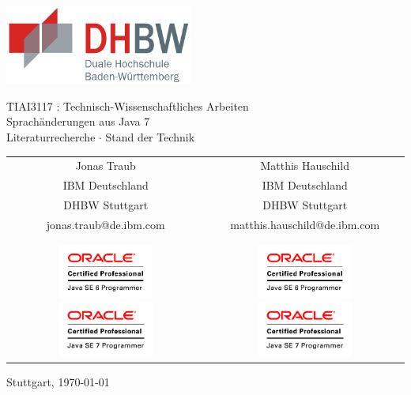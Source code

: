 \begin{titlepage}
    \begin{center}
     \includegraphics[height=2.6cm]{images/dhbw.png}

      \vspace*{12mm}    
      TIAI3117 : Technisch-Wissenschaftliches Arbeiten\\
      \vspace*{30mm}    
      {\Huge{Sprachänderungen aus Java 7}}\\
      \vspace*{5mm}    
      Literaturrecherche $\cdot$ Stand der Technik\\
\vspace*{30mm}

\begin{tabular}{c|c}
Jonas Traub & Matthis Hauschild\\
IBM Deutschland & IBM Deutschland\\
DHBW Stuttgart & DHBW Stuttgart\\
jonas.traub@de.ibm.com & matthis.hauschild@de.ibm.com\\
 & \\
 & \\
\includegraphics[height=1.8cm]{images/OCPJ6P.png} \includegraphics[height=1.8cm]{images/OCPJ7P.png} & \includegraphics[height=1.8cm]{images/OCPJ6P.png} \includegraphics[height=1.8cm]{images/OCPJ7P.png}\\
\end{tabular}

      \vfill
      Stuttgart, \today
    \end{center}
\end{titlepage}

